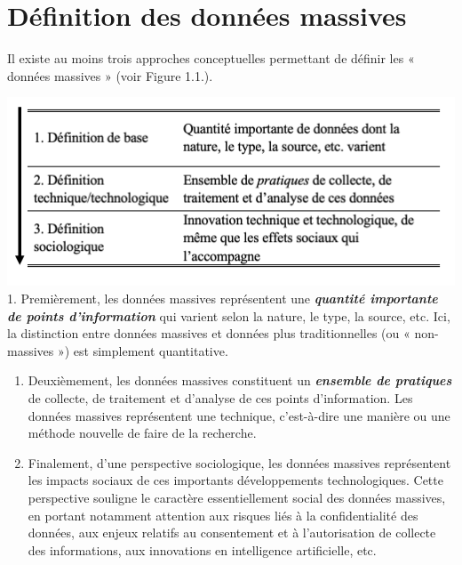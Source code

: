 \documentclass[
  letterpaper,
]{scrbook}
\begin{document}
\hypertarget{duxe9finition-des-donnuxe9es-massives}{%
\section{Définition des données
massives}\label{duxe9finition-des-donnuxe9es-massives}}

Il existe au moins trois approches conceptuelles permettant de définir
les « données massives » (voir Figure 1.1.).

\includegraphics{images/chapitre1_definitions.png} 1. Premièrement, les
données massives représentent une \textbf{\emph{quantité importante de
points d'information}} qui varient selon la nature, le type, la source,
etc. Ici, la distinction entre données massives et données plus
traditionnelles (ou « non-massives ») est simplement quantitative.

\begin{enumerate}
\def\labelenumi{\arabic{enumi}.}
\setcounter{enumi}{1}
\item
  Deuxièmement, les données massives constituent un
  \textbf{\emph{ensemble de pratiques}} de collecte, de traitement et
  d'analyse de ces points d'information. Les données massives
  représentent une technique, c'est-à-dire une manière ou une méthode
  nouvelle de faire de la recherche.
\item
  Finalement, d'une perspective sociologique, les données massives
  représentent les impacts sociaux de ces importants développements
  technologiques. Cette perspective souligne le caractère
  essentiellement social des données massives, en portant notamment
  attention aux risques liés à la confidentialité des données, aux
  enjeux relatifs au consentement et à l'autorisation de collecte des
  informations, aux innovations en intelligence artificielle, etc.
\end{enumerate}
\end{document}
